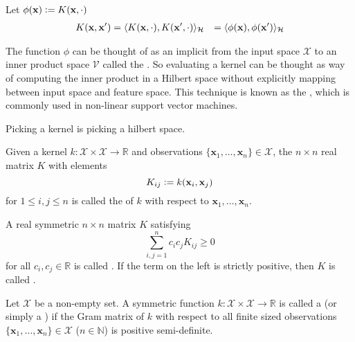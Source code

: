 Let $\phi(\mathbf{x}) \vcentcolon= K(\mathbf{x}, \cdot)$
\begin{align}
  K(\mathbf{x}, \mathbf{x}^\prime) &= \langle K(\mathbf{x}, \cdot), K(\mathbf{x}^\prime, \cdot)\rangle_\mathcal{H}
                                   &= \langle\phi(\mathbf{x}), \phi(\mathbf{x}^\prime)\rangle_\mathcal{H}
\end{align}

The function $\phi$ can be thought of as an implicit  from the input space $\mathcal{X}$ to an inner product space $\mathcal{V}$ called the . So evaluating a kernel can be thought as way of computing the inner product in a Hilbert space without explicitly mapping between input space and feature space. This technique is known as the , which is commonly used in non-linear support vector machines.

Picking a kernel is picking a hilbert space.

\begin{definition}
Given a kernel $k : \mathcal{X} \times \mathcal{X} \to \mathbb{R}$ and observations $\{ \mathbf{x}_1, \dotsc, \mathbf{x}_n \} \in \mathcal{X}$, the $n \times n$ real matrix $K$ with elements
\begin{equation}
  K_{ij} \vcentcolon= k(\mathbf{x}_i, \mathbf{x}_j)
\end{equation}
for $1 \leq i, j \leq n$ is called the  of $k$ with respect to $\mathbf{x}_1, \dotsc, \mathbf{x}_n$.
\end{definition}

\begin{definition}
A real symmetric $n \times n$ matrix $K$ satisfying
\begin{equation}
	\sum_{i, j=1}^n c_i c_j K_{ij} \geq 0
\end{equation}
for all $c_i, c_j \in \mathbb{R}$ is called . If the term on the left is strictly positive, then $K$ is called .
\end{definition}

\begin{definition}
Let $\mathcal{X}$ be a non-empty set. A symmetric function $k : \mathcal{X} \times \mathcal{X} \to \mathbb{R}$ is called a  (or simply a ) if the Gram matrix of $k$ with respect to all finite sized observations $\{ \mathbf{x}_1, \dotsc, \mathbf{x}_n \} \in \mathcal{X}$ ($n \in \mathbb{N}$) is positive semi-definite.
\end{definition}

